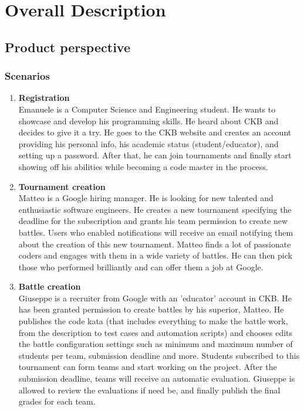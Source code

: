 \section{Overall Description}

\subsection{Product perspective}
\subsubsection{Scenarios}
\begin{enumerate}[label=\textbf{\Alph*}.]
    \item \textbf{Registration} \\
        Emanuele is a Computer Science and Engineering student. He wants to showcase and develop his programming skills. He heard about CKB and decides to give it a try. He goes to the CKB website and creates an account providing his personal info, his academic status (student/educator),  and setting up a password. After that, he can join tournaments and finally start showing off his abilities while becoming a code master in the process.\\
    \item \textbf{Tournament creation} \\
        Matteo is a Google hiring manager. He is looking for new talented and enthusiastic software engineers. He creates a new tournament specifying the deadline for the subscription and grants his team permission to create new battles. Users who enabled notifications will receive an email notifying them about the creation of this new tournament. Matteo finds a lot of passionate coders and engages with them in a wide variety of battles. He can then pick those who performed brilliantly and can offer them a job at Google.\\
    \item \textbf{Battle creation} \\
        Giuseppe is a recruiter from Google with an 'educator' account in CKB. He has been granted permission to create battles  by his superior, Matteo. He publishes the code kata (that includes everything to make the battle work, from the description to test cases and automation scripts) and chooses edits the battle configuration settings such as minimum and maximum number of students per team, submission deadline and more. Students subscribed to this tournament can form teams and start working on the project. After the submission deadline, teams will receive an automatic evaluation. Giuseppe is allowed to review the evaluations if need be, and finally publish the final grades for each team.  \\ 

\end{enumerate}
